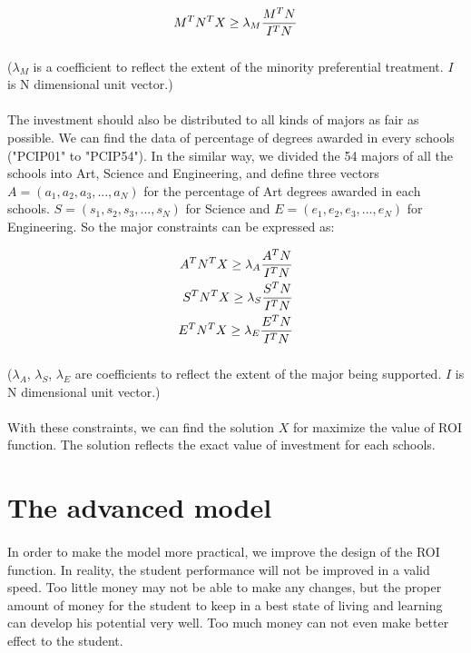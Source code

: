 \documentclass[11pt]{article}
\begin{document}
\begin{align}
M^T\*N^T\*X\geq\lambda_M\*\frac{M^T\*N}{I^T\*N}
\end{align}

\subparagraph{} ($\lambda_M$ is a coefficient to reflect the extent of the minority preferential treatment. $I$ is N dimensional unit vector.)
 
\paragraph{} The investment should also be distributed to all kinds of majors as fair as possible. We can find the data of percentage of degrees awarded in every schools ("PCIP01" to "PCIP54"). In the similar way, we divided the 54 majors of all the schools into Art, Science and Engineering, and define three vectors $A=(a_1, a_2, a_3, ..., a_N)$ for the percentage of Art degrees awarded in each schools. $S=(s_1, s_2, s_3, ..., s_N)$ for Science and $E=(e_1, e_2, e_3, ..., e_N)$ for Engineering. So the  major constraints can be expressed as:

\begin{align}
A^T\*N^T\*X\geq\lambda_A\*\frac{A^T\*N}{I^T\*N}\\
S^T\*N^T\*X\geq\lambda_S\*\frac{S^T\*N}{I^T\*N}\\
E^T\*N^T\*X\geq\lambda_E\*\frac{E^T\*N}{I^T\*N}\\
\end{align}

\subparagraph{} ($\lambda_A$, $\lambda_S$, $\lambda_E$ are coefficients to reflect the extent of the major being supported. $I$ is N dimensional unit vector.)
\paragraph{} With these constraints, we can find the solution $X$ for maximize the value of ROI function. The solution reflects the exact value of investment for each schools. 

\section{The advanced model} 
\paragraph{} In order to make the model more practical, we improve the design of the ROI function. In reality, the student performance will not be improved in a valid speed. Too little money may not be able to make any changes, but the proper amount of money for the student to keep in a best state of living and learning can develop his potential very well. Too much money can not even make better effect to the student.
\end{document}
